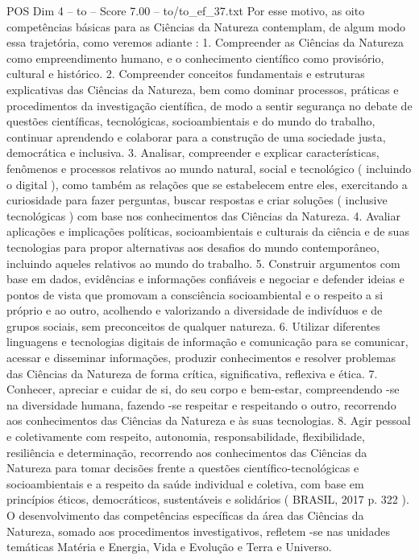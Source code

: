 \begin{textsample}{POS Dim 4 – to – Score 7.00 – to/to\_ef\_37.txt}
Por esse motivo, as oito competências básicas para as Ciências da Natureza contemplam, de algum modo essa trajetória, como veremos adiante : 1.
Compreender as Ciências da Natureza como empreendimento humano, e o conhecimento científico como provisório, cultural e histórico. 2.
Compreender conceitos fundamentais e estruturas explicativas das Ciências da Natureza, bem como dominar processos, práticas e procedimentos da investigação científica, de modo a sentir segurança no debate de questões científicas, tecnológicas, socioambientais e do mundo do trabalho, continuar aprendendo e colaborar para a construção de uma sociedade justa, democrática e inclusiva. 3.
Analisar, compreender e explicar características, fenômenos e processos relativos ao mundo natural, social e tecnológico ( incluindo o digital ), como também as relações que se estabelecem entre eles, exercitando a curiosidade para fazer perguntas, buscar respostas e criar soluções ( inclusive tecnológicas ) com base nos conhecimentos das Ciências da Natureza. 4.
Avaliar aplicações e implicações políticas, socioambientais e culturais da ciência e de suas tecnologias para propor alternativas aos desafios do mundo contemporâneo, incluindo aqueles relativos ao mundo do trabalho. 5.
Construir argumentos com base em dados, evidências e informações confiáveis e negociar e defender ideias e pontos de vista que promovam a consciência socioambiental e o respeito a si próprio e ao outro, acolhendo e valorizando a diversidade de indivíduos e de grupos sociais, sem preconceitos de qualquer natureza. 6.
Utilizar diferentes linguagens e tecnologias digitais de informação e comunicação para se comunicar, acessar e disseminar informações, produzir conhecimentos e resolver problemas das Ciências da Natureza de forma crítica, significativa, reflexiva e ética. 7.
Conhecer, apreciar e cuidar de si, do seu corpo e bem-estar, compreendendo -se na diversidade humana, fazendo -se respeitar e respeitando o outro, recorrendo aos conhecimentos das Ciências da Natureza e às suas tecnologias. 8.
Agir pessoal e coletivamente com respeito, autonomia, responsabilidade, flexibilidade, resiliência e determinação, recorrendo aos conhecimentos das Ciências da Natureza para tomar decisões frente a questões científico-tecnológicas e socioambientais e a respeito da saúde individual e coletiva, com base em princípios éticos, democráticos, sustentáveis e solidários ( BRASIL, 2017 p. 322 ).
O desenvolvimento das competências específicas da área das Ciências da Natureza, somado aos procedimentos investigativos, refletem -se nas unidades temáticas Matéria e Energia, Vida e Evolução e Terra e Universo.

\end{textsample}
